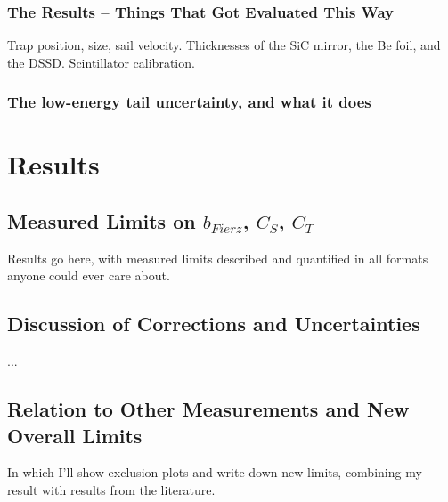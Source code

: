 	\subsection{The Results -- Things That Got Evaluated This Way}
	Trap position, size, sail velocity.  Thicknesses of the SiC mirror, the Be foil, and the DSSD.  Scintillator calibration.  
	
	\subsection{The low-energy tail uncertainty, and what it does}


\clearpage	
\chapter{Results}

\section{Measured Limits on $b_{Fierz}$, $C_S$, $C_T$}
	Results go here, with measured limits described and quantified in all formats anyone could ever care about.
	
\section{Discussion of Corrections and Uncertainties}
	...
	
\section{Relation to Other Measurements and New Overall Limits}
	In which I'll show exclusion plots and write down new limits, combining my result with results from the literature.


